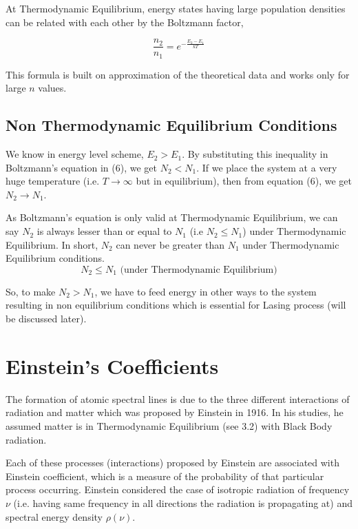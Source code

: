 \documentclass[12pt]{article}
\begin{document}
At Thermodynamic Equilibrium, energy states having large population densities can be related with each other by the Boltzmann factor,

\begin{equation}
    \frac{n_{2}}{n_{1}} = e^{-\frac{E_{2} - E_{1}}{kT}}
\end{equation}

This formula is built on approximation of the theoretical data and works only for large $n$ values.

\subsection{Non Thermodynamic Equilibrium Conditions}

We know in energy level scheme, $E_{2} > E_{1}$. By substituting this inequality in Boltzmann's equation in (6), we get $N_{2} < N_{1}$. If we place the system at a very huge temperature (i.e. $T \rightarrow \infty$ but in equilibrium), then from equation (6), we get $N_{2} \rightarrow N_{1}$. \vspace{.2cm}

As Boltzmann's equation is only valid at Thermodynamic Equilibrium, we can say $N_{2}$ is always lesser than or equal to $N_{1}$ (i.e $N_{2} \le N_{1}$) under Thermodynamic Equilibrium. In short, $N_{2}$ can never be greater than $N_{1}$ under Thermodynamic Equilibrium conditions. 
\begin{equation*}
    N_{2} \le N_{1} \text{ (under Thermodynamic Equilibrium)}
\end{equation*}

So, to make $N_{2} > N_{1}$, we have to feed energy in other ways to the system resulting in non equilibrium conditions which is essential for Lasing process (will be discussed later). 

\section{Einstein's Coefficients}

The formation of atomic spectral lines is due to the three different interactions of radiation and matter which was proposed by Einstein in 1916. In his studies, he assumed matter is in Thermodynamic Equilibrium (see 3.2) with Black Body radiation. \vspace{.2cm}

Each of these processes (interactions) proposed by Einstein are associated with Einstein coefficient, which is a measure of the probability of that particular process occurring. Einstein considered the case of isotropic radiation of frequency $\nu$ (i.e. having same frequency in all directions the radiation is propagating at) and spectral energy density $\rho(\nu)$. \vspace{.2cm}
\end{document}
